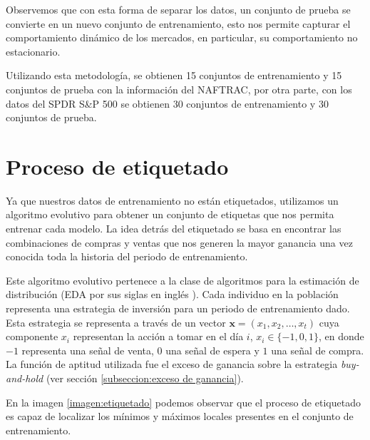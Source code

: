 \documentclass[12pt]{scrbook}
\theoremstyle{break}
\theoremstyle{break}
\newcommand{\buyhold}{\textit{buy-and-hold} }
\begin{document}
Observemos que con esta forma de separar los datos, un conjunto de prueba se convierte en un nuevo conjunto de entrenamiento, esto nos permite capturar el comportamiento dinámico de los mercados, en particular, su comportamiento no estacionario.

Utilizando esta metodología, se obtienen 15 conjuntos de entrenamiento y 15 conjuntos de prueba con la información del NAFTRAC, por otra parte, con los datos del SPDR S\&P 500 se obtienen 30 conjuntos de entrenamiento y 30 conjuntos de prueba.


\section{Proceso de etiquetado}
\label{seccion:proceso etiquetado}
Ya que nuestros datos de entrenamiento no están etiquetados, utilizamos un algoritmo evolutivo para obtener un conjunto de etiquetas que nos permita entrenar cada modelo. La idea detrás del etiquetado se basa en encontrar las combinaciones de compras y ventas que nos generen la mayor ganancia una vez conocida toda la historia del periodo de entrenamiento.

Este algoritmo evolutivo pertenece a la clase de algoritmos para la estimación de distribución (EDA por sus siglas en inglés \cite{simon2013evolutionary}). Cada individuo en la población representa una estrategia de inversión para un periodo de entrenamiento dado. Esta estrategia se representa a través de un vector $\mathbf{x} = (x_1, x_2, \ldots, x_t)$ cuya componente $x_i$ representan la acción a tomar en el día $i$, $x_i \in \{-1,0,1\}$, en donde $-1$ representa una señal de venta, $0$ una señal de espera y $1$ una señal de compra. La función de aptitud utilizada fue el exceso de ganancia sobre la estrategia \buyhold (ver sección \ref{subseccion:exceso de ganancia}).

En la imagen \ref{imagen:etiquetado} podemos observar que el proceso de etiquetado es capaz de localizar los mínimos y máximos locales presentes en el conjunto de entrenamiento.
\end{document}
